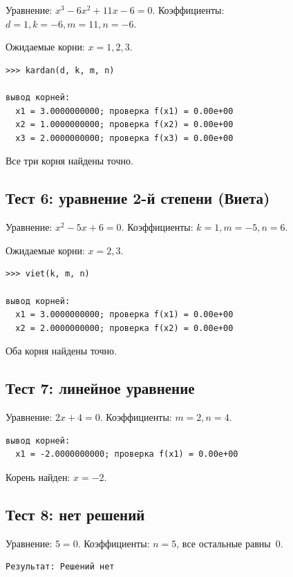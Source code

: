 \documentclass[a4paper,14pt]{extarticle}
\begin{document}
Уравнение: $x^3 - 6x^2 + 11x - 6 = 0$. Коэффициенты: $d=1, k=-6, m=11, n=-6$.

Ожидаемые корни: $x = 1, 2, 3$.

\begin{Verbatim}[frame=single,fontsize=\footnotesize]
>>> kardan(d, k, m, n)

вывод корней:
  x1 = 3.0000000000; проверка f(x1) = 0.00e+00
  x2 = 1.0000000000; проверка f(x2) = 0.00e+00
  x3 = 2.0000000000; проверка f(x3) = 0.00e+00
\end{Verbatim}

Все три корня найдены точно.

\subsection*{Тест 6: уравнение 2-й степени (Виета)}

Уравнение: $x^2 - 5x + 6 = 0$. Коэффициенты: $k=1, m=-5, n=6$.

Ожидаемые корни: $x = 2, 3$.

\begin{Verbatim}[frame=single,fontsize=\footnotesize]
>>> viet(k, m, n)

вывод корней:
  x1 = 3.0000000000; проверка f(x1) = 0.00e+00
  x2 = 2.0000000000; проверка f(x2) = 0.00e+00
\end{Verbatim}

Оба корня найдены точно.

\subsection*{Тест 7: линейное уравнение}

Уравнение: $2x + 4 = 0$. Коэффициенты: $m=2, n=4$.

\begin{Verbatim}[frame=single,fontsize=\footnotesize]
вывод корней:
  x1 = -2.0000000000; проверка f(x1) = 0.00e+00
\end{Verbatim}

Корень найден: $x = -2$.

\subsection*{Тест 8: нет решений}

Уравнение: $5 = 0$. Коэффициенты: $n=5$, все остальные равны~0.

\begin{Verbatim}[frame=single,fontsize=\footnotesize]
Результат: Решений нет
\end{Verbatim}
\end{document}
